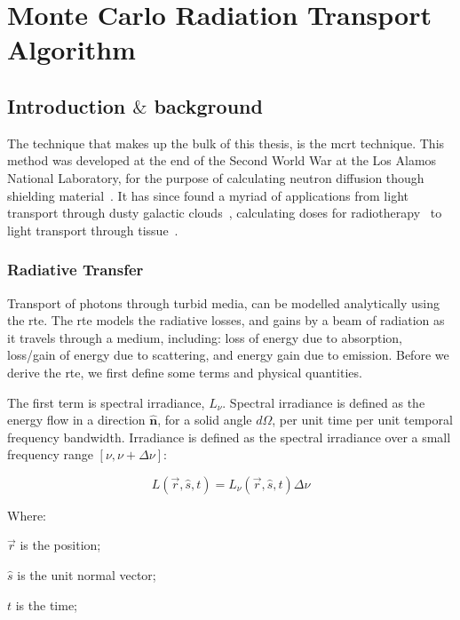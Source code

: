 \section{Monte Carlo Radiation Transport Algorithm}

\subsection{Introduction \texorpdfstring{$\&$}{and} background}
The technique that makes up the bulk of this thesis, is the \gls*{mcrt} technique. This method was developed at the end of the Second World War at the Los Alamos National Laboratory, for the purpose of calculating neutron diffusion though shielding material~\cite{montybeg1,eckhardt1987stan,anderson1986metropolis,ulam1947statistical}. It has since found a myriad of applications from light transport through dusty galactic clouds~\cite{wood1999model}, calculating doses for radiotherapy~\cite{rogers1995beam} to light transport through tissue~\cite{1stmonty}.



\subsubsection*{Radiative Transfer}
Transport of photons through turbid media, can be modelled analytically using the \gls*{rte}. The \gls*{rte} models the radiative losses, and gains by a beam of radiation as it travels through a medium, including: loss of energy due to absorption, loss/gain of energy due to scattering, and energy gain due to emission. Before we derive the \gls*{rte}, we first define some terms and physical quantities.


The first term is spectral irradiance, $L_\nu$. Spectral irradiance is defined as the energy flow in a direction $\mathbf{\hat{n}}$, for a solid angle $d\Omega$, per unit time per unit temporal frequency bandwidth.	
Irradiance is defined as the spectral irradiance over a small frequency range $[\nu, \nu+\Delta \nu]$:

\begin{equation}
	L(\vec{r},\hat{s},t) = L_{\nu}(\vec{r},\hat{s},t)\Delta \nu	
\end{equation}

\noindent Where:

\indent $\vec{r}$ is the position;

\indent $\hat{s}$ is the unit normal vector;

\indent $t$ is the time;

